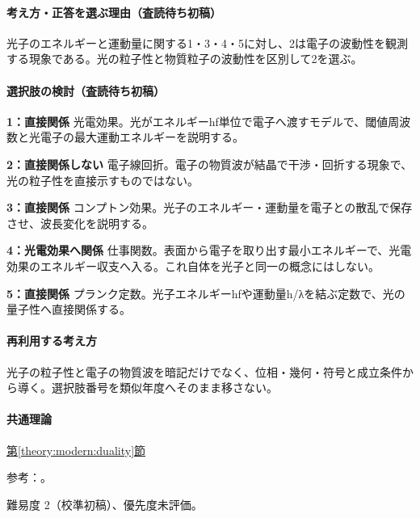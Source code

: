 \paragraph{考え方・正答を選ぶ理由（査読待ち初稿）} 光子のエネルギーと運動量に関する1・3・4・5に対し、2は電子の波動性を観測する現象である。光の粒子性と物質粒子の波動性を区別して2を選ぶ。

\paragraph{選択肢の検討（査読待ち初稿）}\mbox{}\par

\noindent\textbf{1：直接関係} 光電効果。光がエネルギーhf単位で電子へ渡すモデルで、閾値周波数と光電子の最大運動エネルギーを説明する。\par

\noindent\textbf{2：直接関係しない} 電子線回折。電子の物質波が結晶で干渉・回折する現象で、光の粒子性を直接示すものではない。\par

\noindent\textbf{3：直接関係} コンプトン効果。光子のエネルギー・運動量を電子との散乱で保存させ、波長変化を説明する。\par

\noindent\textbf{4：光電効果へ関係} 仕事関数。表面から電子を取り出す最小エネルギーで、光電効果のエネルギー収支へ入る。これ自体を光子と同一の概念にはしない。\par

\noindent\textbf{5：直接関係} プランク定数。光子エネルギーhfや運動量h/λを結ぶ定数で、光の量子性へ直接関係する。\par

\paragraph{再利用する考え方} 光子の粒子性と電子の物質波を暗記だけでなく、位相・幾何・符号と成立条件から導く。選択肢番号を類似年度へそのまま移さない。

\paragraph{共通理論} \hyperref[theory:modern:duality]{第\ref*{theory:modern:duality}節}

\par 参考：\cite{os_photoelectric,os_matter}。

\par 難易度 2（校準初稿）、優先度未評価。

